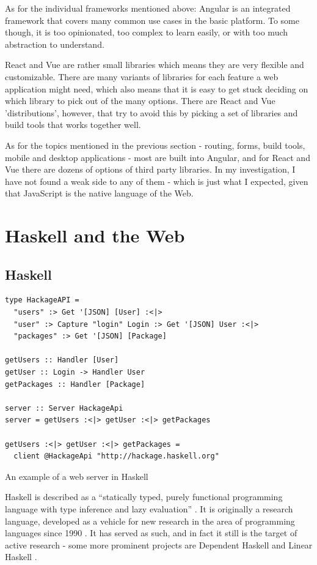 \documentclass[english,odsaz]{fitthesis}
\begin{document}
As for the individual frameworks mentioned above: Angular is an integrated
framework that covers many common use cases in the basic platform. To some
though, it is too opinionated, too complex to learn easily, or with too much
abstraction to understand.

React and Vue are rather small libraries which means they are very flexible and
customizable. There are many variants of libraries for each feature a web
application might need, which also means that it is easy to get stuck deciding
on which library to pick out of the many options. There are React and Vue
'distributions', however, that try to avoid this by picking a set of libraries
and build tools that works together well.

As for the topics mentioned in the previous section - routing, forms, build
tools, mobile and desktop applications - most are built into Angular, and for
React and Vue there are dozens of options of third party libraries. In my
investigation, I have not found a weak side to any of them - which is just what
I expected, given that JavaScript is the native language of the Web.

\chapter{Haskell and the Web}
\label{sec:org9e1c514}
\section{Haskell}
\label{sec:orgea21860}
\begin{listing}[htbp]
\begin{verbatim}
type HackageAPI =
  "users" :> Get '[JSON] [User] :<|>
  "user" :> Capture "login" Login :> Get '[JSON] User :<|>
  "packages" :> Get '[JSON] [Package]

getUsers :: Handler [User]
getUser :: Login -> Handler User
getPackages :: Handler [Package]

server :: Server HackageApi
server = getUsers :<|> getUser :<|> getPackages

getUsers :<|> getUser :<|> getPackages =
  client @HackageApi "http://hackage.haskell.org"
\end{verbatim}
\caption{An example of a web server in Haskell}
\end{listing}

Haskell is described as a ``statically typed, purely functional programming
language with type inference and lazy evaluation'' \cite{jones2003haskell}. It is
originally a research language, developed as a vehicle for new research in the
area of programming languages since 1990 \cite{haskell_history}. It has served as
such, and in fact it still is the target of active research - some more
prominent projects are Dependent Haskell \cite{eisenberg2016dependent} and Linear
Haskell \cite{bernardy2017linear}.
\end{document}
